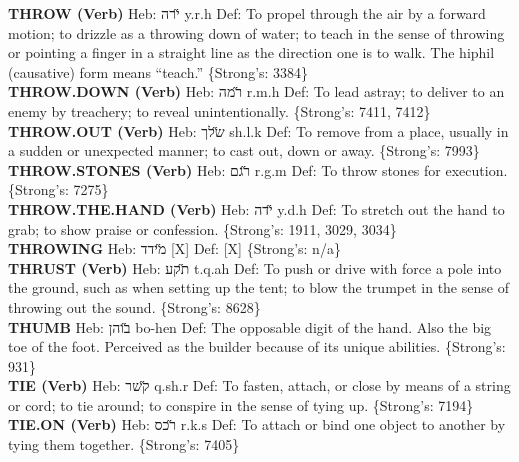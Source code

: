{\textbf{THROW (Verb)} Heb: {\large\H ירה} y.r.h Def: To propel through the air by a forward motion; to drizzle as a throwing down of water; to teach in the sense of throwing or pointing a finger in a straight line as the direction one is to walk. The hiphil (causative) form means ``teach.'' \{Strong's: 3384\}\hfill{}\\

\textbf{THROW.DOWN (Verb)} Heb: {\large\H רמה} r.m.h Def: To lead astray; to deliver to an enemy by treachery; to reveal unintentionally. \{Strong's: 7411, 7412\}\hfill{}\\

\textbf{THROW.OUT (Verb)} Heb: {\large\H שלך} sh.l.k Def: To remove from a place, usually in a sudden or unexpected manner; to cast out, down or away. \{Strong's: 7993\}\hfill{}\\

\textbf{THROW.STONES (Verb)} Heb: {\large\H רגם} r.g.m Def: To throw stones for execution. \{Strong's: 7275\}\hfill{}\\

\textbf{THROW.THE.HAND (Verb)} Heb: {\large\H ידה} y.d.h Def: To stretch out the hand to grab; to show praise or confession. \{Strong's: 1911, 3029, 3034\}\hfill{}\\

\textbf{THROWING} Heb: {\large\H מידד} {[}X{]} Def: {[}X{]} \{Strong's: n/a\}\hfill{}\\

\textbf{THRUST (Verb)} Heb: {\large\H תקע} t.q.ah Def: To push or drive with force a pole into the ground, such as when setting up the tent; to blow the trumpet in the sense of throwing out the sound. \{Strong's: 8628\}\hfill{}\\

\textbf{THUMB} Heb: {\large\H בוהן} bo-hen Def: The opposable digit of the hand. Also the big toe of the foot. Perceived as the builder because of its unique abilities. \{Strong's: 931\}\hfill{}\\

\textbf{TIE (Verb)} Heb: {\large\H קשר} q.sh.r Def: To fasten, attach, or close by means of a string or cord; to tie around; to conspire in the sense of tying up. \{Strong's: 7194\}\hfill{}\\

\textbf{TIE.ON (Verb)} Heb: {\large\H רכס} r.k.s Def: To attach or bind one object to another by tying them together. \{Strong's: 7405\}\hfill{}\\

}
